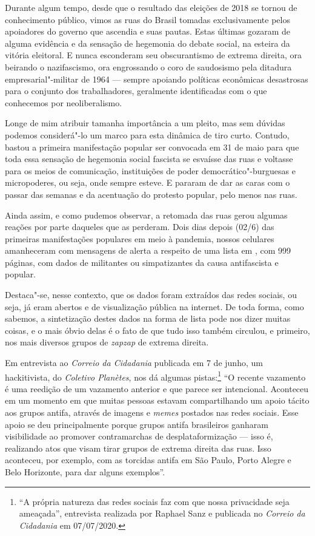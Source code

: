 
Durante algum tempo, desde que o resultado das eleições de 2018 se
tornou de conhecimento público, vimos as ruas do Brasil tomadas
exclusivamente pelos apoiadores do governo que ascendia e suas pautas.
Estas últimas gozaram de alguma evidência e da sensação de hegemonia do
debate social, na esteira da vitória eleitoral. E nunca esconderam seu
obscurantismo de extrema direita, ora beirando o nazifascismo, ora
engrossando o coro de saudosismo pela ditadura empresarial"-militar de 1964
--- sempre apoiando políticas econômicas desastrosas para o conjunto dos
trabalhadores, geralmente identificadas com o que conhecemos por
neoliberalismo.

Longe de mim atribuir tamanha importância a um pleito, mas sem dúvidas
podemos considerá"-lo um marco para esta dinâmica de tiro curto. Contudo,
bastou a primeira manifestação popular ser convocada em 31 de maio para
que toda essa sensação de hegemonia social fascista se esvaísse das ruas
e voltasse para os meios de comunicação, instituições de poder
democrático"-burguesas e micropoderes, ou seja, onde sempre esteve. E
pararam de dar as caras com o passar das semanas e da acentuação do
protesto popular, pelo menos nas ruas.

Ainda assim, e como pudemos observar, a retomada das ruas gerou algumas
reações por parte daqueles que as perderam. Dois dias depois (02/6) das
primeiras manifestações populares em meio à pandemia, nossos celulares
amanheceram com mensagens de alerta a respeito de uma lista em , com
999 páginas, com dados de militantes ou simpatizantes da causa
antifascista e popular.

Destaca"-se, nesse contexto, que os dados foram extraídos das redes
sociais, ou seja, já eram abertos e de visualização pública na internet.
De toda forma, como sabemos, a sintetização destes dados na forma de
lista pode nos dizer muitas coisas, e o mais óbvio delas é o fato de que
tudo isso também circulou, e primeiro, nos mais diversos grupos de
\emph{zapzap} de extrema direita.

Em entrevista ao \emph{Correio da Cidadania} publicada em 7 de junho, um
hackitivista, do \emph{Coletivo Planètes}, nos dá algumas pistas:\footnote{``A própria natureza das redes sociais faz com que nossa
privacidade seja ameaçada'', entrevista realizada por Raphael Sanz e
publicada no \emph{Correio da Cidadania} em 07/07/2020.} ``O
recente vazamento é uma reedição de um vazamento anterior e que parece
ser intencional. Aconteceu em um momento em que muitas pessoas estavam
compartilhando um apoio tácito aos grupos antifa, através de
imagens e \emph{memes} postados nas redes sociais. Esse apoio se deu
principalmente porque grupos antifa brasileiros ganharam visibilidade ao
promover contramarchas de desplataformização --- isso é, realizando atos
que visam tirar grupos de extrema direita das ruas. Isso aconteceu, por
exemplo, com as torcidas antifa em São Paulo, Porto Alegre e Belo
Horizonte, para dar alguns exemplos''.

